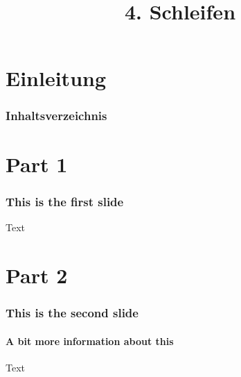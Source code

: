 

\title{\\{\scriptsize 4. Schleifen}}


  

    \section{Einleitung}
    \begin{frame}
        \frametitle{Inhaltsverzeichnis}
        \tableofcontents[currentsection]
    \end{frame}

    \section{Part 1}
    \begin{frame}
        \frametitle{This is the first slide}
        Text
    \end{frame}

    \section{Part 2}
    \begin{frame}
        \frametitle{This is the second slide}
        \framesubtitle{A bit more information about this}
        Text
    \end{frame}

